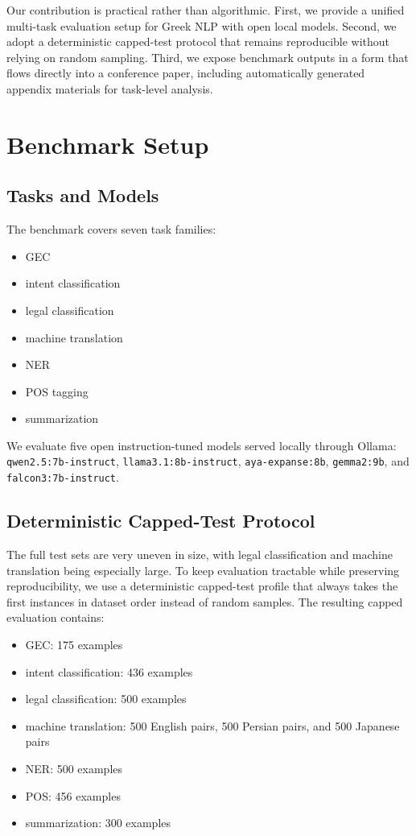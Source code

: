 \documentclass[sigconf,review,anonymous]{acmart}
\begin{document}
Our contribution is practical rather than algorithmic. First, we provide a unified multi-task evaluation setup for Greek NLP with open local models. Second, we adopt a deterministic capped-test protocol that remains reproducible without relying on random sampling. Third, we expose benchmark outputs in a form that flows directly into a conference paper, including automatically generated appendix materials for task-level analysis.

\section{Benchmark Setup}
\subsection{Tasks and Models}
The benchmark covers seven task families:
\begin{itemize}[leftmargin=1.2em]
\item GEC
\item intent classification
\item legal classification
\item machine translation
\item NER
\item POS tagging
\item summarization
\end{itemize}

We evaluate five open instruction-tuned models served locally through Ollama:
\texttt{qwen2.5:7b-instruct},
\texttt{llama3.1:8b-instruct},
\texttt{aya-expanse:8b},
\texttt{gemma2:9b}, and
\texttt{falcon3:7b-instruct}.

\subsection{Deterministic Capped-Test Protocol}
The full test sets are very uneven in size, with legal classification and machine translation being especially large. To keep evaluation tractable while preserving reproducibility, we use a deterministic capped-test profile that always takes the first instances in dataset order instead of random samples. The resulting capped evaluation contains:
\begin{itemize}[leftmargin=1.2em]
\item GEC: 175 examples
\item intent classification: 436 examples
\item legal classification: 500 examples
\item machine translation: 500 English pairs, 500 Persian pairs, and 500 Japanese pairs
\item NER: 500 examples
\item POS: 456 examples
\item summarization: 300 examples
\end{itemize}
\end{document}
